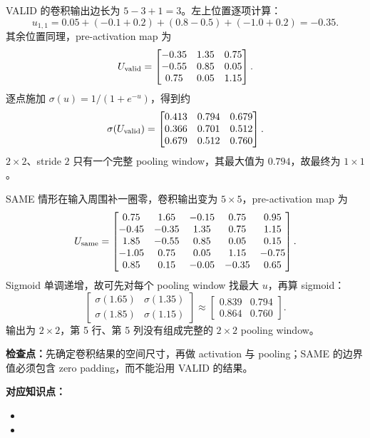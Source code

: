 \begin{workedsolution}
VALID 的卷积输出边长为 $5-3+1=3$。左上位置逐项计算：
\[
u_{1,1}=0.05+(-0.1+0.2)+(0.8-0.5)+(-1.0+0.2)=-0.35.
\]
其余位置同理，pre-activation map 为
\[
U_{\rm valid}=\begin{bmatrix}
-0.35&1.35&0.75\\-0.55&0.85&0.05\\0.75&0.05&1.15
\end{bmatrix}.
\]
逐点施加 $\sigma(u)=1/(1+e^{-u})$，得到约
\[
\sigma(U_{\rm valid})=\begin{bmatrix}
0.413&0.794&0.679\\0.366&0.701&0.512\\0.679&0.512&0.760
\end{bmatrix}.
\]
$2\times2$、stride $2$ 只有一个完整 pooling window，其最大值为 $\boxed{0.794}$，故最终为 $1\times1$。

SAME 情形在输入周围补一圈零，卷积输出变为 $5\times5$，pre-activation map 为
\[
U_{\rm same}=\begin{bmatrix}
0.75&1.65&-0.15&0.75&0.95\\
-0.45&-0.35&1.35&0.75&1.15\\
1.85&-0.55&0.85&0.05&0.15\\
-1.05&0.75&0.05&1.15&-0.75\\
0.85&0.15&-0.05&-0.35&0.65
\end{bmatrix}.
\]
Sigmoid 单调递增，故可先对每个 pooling window 找最大 $u$，再算 sigmoid：
\[
\begin{bmatrix}
\sigma(1.65)&\sigma(1.35)\\
\sigma(1.85)&\sigma(1.15)
\end{bmatrix}
\approx
\boxed{\begin{bmatrix}0.839&0.794\\0.864&0.760\end{bmatrix}}.
\]
输出为 $2\times2$，第 5 行、第 5 列没有组成完整的 $2\times2$ pooling window。
\end{workedsolution}

\textbf{检查点：}先确定卷积结果的空间尺寸，再做 activation 与 pooling；SAME 的边界值必须包含 zero padding，而不能沿用 VALID 的结果。


\textbf{对应知识点：}
\begin{itemize}
  \item {}
  \item {}
\end{itemize}

